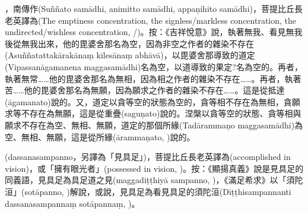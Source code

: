 \startitemgroup[noteitems]
\item{}，南傳作(Suññato samādhi, animitto samādhi, appaṇihito samādhi)，菩提比丘長老英譯為(The emptiness concentration, the signless/markless concentration, the undirected/wishless concentration, /)。按：《吉祥悅意》說，執著無我、看見無我後從無我出來，他的毘婆舍那名為空，因為非空之作者的雜染不存在(Asuññatattakārakānaṃ kilesānaṃ abhāvā)，以毘婆舍那導致的道定(Vipassanāgamanena maggasamādhi)名為空，以道導致的果{定?}名為空的。再者，執著無常……他的毘婆舍那名為無相，因為相之作者的雜染不存在……。再者，執著苦……他的毘婆舍那名為無願，因為願求之作者的雜染不存在……。這是從抵達(āgamanato)說的。又，道定以貪等空的狀態為空的，貪等相不存在為無相，貪願求等不存在為無願，這是從重疊(saguṇato)說的。涅槃以貪等空的狀態、貪等相與願求不存在為空、無相、無願，道定的那個所緣(Tadārammaṇo maggasamādhi)為空、無相、無願，這是從所緣(ārammaṇato, )說的。
\stopitemgroup

\startitemgroup[noteitems]
\item{}(dassanasampanno，另譯為「見具足」)，菩提比丘長老英譯為(accomplished in vision)，或「擁有眼光者」(possessed in vision, )。按：《顯揚真義》說是見具足的同義語，見具足為具足道之見(maggadiṭṭhiyā sampanno, )，《滿足希求》以「須陀洹」(sotāpanno, )解說，或說，見具足為看見具足的須陀洹(Diṭṭhisampannanti dassanasampannaṃ sotāpannaṃ, )。
\stopitemgroup

